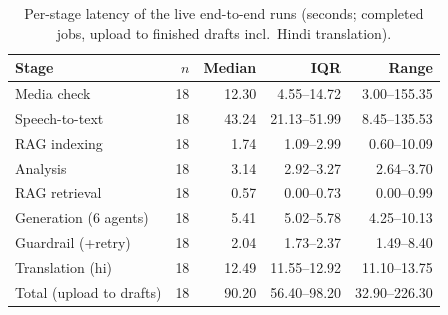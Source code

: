 \begin{table}[t]
\centering
\caption{Per-stage latency of the live end-to-end runs (seconds; completed jobs, upload to finished drafts incl.\ Hindi translation).}
\label{tab:latency}
\footnotesize
\setlength{\tabcolsep}{3.5pt}
\begin{tabular}{lrrrr}
\toprule
Stage & $n$ & Median & IQR & Range \\
\midrule
Media check & 18 & 12.30 & 4.55--14.72 & 3.00--155.35 \\
Speech-to-text & 18 & 43.24 & 21.13--51.99 & 8.45--135.53 \\
RAG indexing & 18 & 1.74 & 1.09--2.99 & 0.60--10.09 \\
Analysis & 18 & 3.14 & 2.92--3.27 & 2.64--3.70 \\
RAG retrieval & 18 & 0.57 & 0.00--0.73 & 0.00--0.99 \\
Generation (6 agents) & 18 & 5.41 & 5.02--5.78 & 4.25--10.13 \\
Guardrail (+retry) & 18 & 2.04 & 1.73--2.37 & 1.49--8.40 \\
Translation (hi) & 18 & 12.49 & 11.55--12.92 & 11.10--13.75 \\
\midrule
Total (upload to drafts) & 18 & 90.20 & 56.40--98.20 & 32.90--226.30 \\
\bottomrule
\end{tabular}
\end{table}
